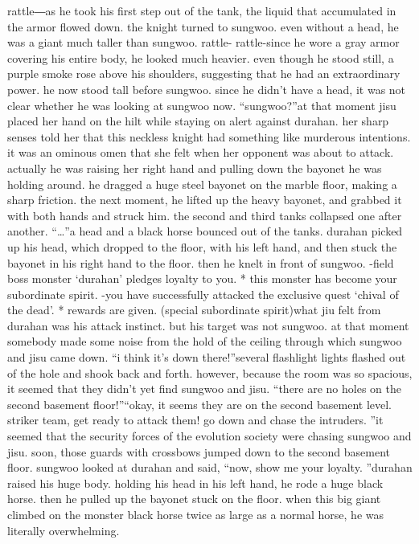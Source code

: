 rattle―as he took his first step out of the tank, the liquid that accumulated in the armor flowed down.
the knight turned to sungwoo.
 even without a head, he was a giant much taller than sungwoo.
rattle- rattle-since he wore a gray armor covering his entire body, he looked much heavier.
even though he stood still, a purple smoke rose above his shoulders, suggesting that he had an extraordinary power.
he now stood tall before sungwoo.
 since he didn’t have a head, it was not clear whether he was looking at sungwoo now.
“sungwoo?”at that moment jisu placed her hand on the hilt while staying on alert against durahan.
her sharp senses told her that this neckless knight had something like murderous intentions.
it was an ominous omen that she felt when her opponent was about to attack.
actually he was raising her right hand and pulling down the bayonet he was holding around.
he dragged a huge steel bayonet on the marble floor, making a sharp friction.
the next moment, he lifted up the heavy bayonet, and grabbed it with both hands and struck him.
the second and third tanks collapsed one after another.
“…”a head and a black horse bounced out of the tanks.
 durahan picked up his head, which dropped to the floor, with his left hand, and then stuck the bayonet in his right hand to the floor.
then he knelt in front of sungwoo.
-field boss monster ‘durahan’ pledges loyalty to you.
* this monster has become your subordinate spirit.
-you have successfully attacked the exclusive quest ‘chival of the dead’.
* rewards are given.
 (special subordinate spirit)what jiu felt from durahan was his attack instinct.
 but his target was not sungwoo.
at that moment somebody made some noise from the hold of the ceiling through which sungwoo and jisu came down.
“i think it’s down there!”several flashlight lights flashed out of the hole and shook back and forth.
 however, because the room was so spacious, it seemed that they didn’t yet find sungwoo and jisu.
“there are no holes on the second basement floor!”“okay, it seems they are on the second basement level.
 striker team, get ready to attack them! go down and chase the intruders.
”it seemed that the security forces of the evolution society were chasing sungwoo and jisu.
 soon, those guards with crossbows jumped down to the second basement floor.
sungwoo looked at durahan and said, “now, show me your loyalty.
”durahan raised his huge body.
 holding his head in his left hand, he rode a huge black horse.
 then he pulled up the bayonet stuck on the floor.
when this big giant climbed on the monster black horse twice as large as a normal horse, he was literally overwhelming.

